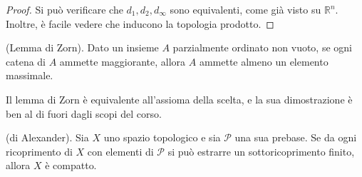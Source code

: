 \begin{proof}
	Si può verificare che $d_1,d_2,d_\infty$ sono equivalenti, come già visto su
	$\mathbb{R}^n$. Inoltre, è facile vedere che inducono la topologia
	prodotto.
\end{proof}

\begin{thm}
    (Lemma di Zorn). Dato un insieme $A$ parzialmente ordinato non vuoto, se ogni catena di $A$ ammette maggiorante, allora $A$ ammette almeno un elemento massimale.
\end{thm}
\begin{oss}
    Il lemma di Zorn \`e equivalente all'assioma della scelta, e la sua dimostrazione \`e ben al di fuori dagli scopi del corso.
\end{oss}
\begin{thm}
    (di Alexander). Sia $X$ uno spazio topologico e sia $\mathcal{P}$ una sua prebase. Se da ogni ricoprimento di $X$ con elementi di $\mathcal{P}$ si pu\`o estrarre un sottoricoprimento finito, allora $X$ \`e compatto.
\end{thm}
